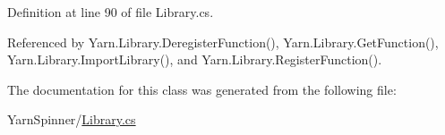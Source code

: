 Definition at line 90 of file Library.\-cs.



Referenced by Yarn.\-Library.\-Deregister\-Function(), Yarn.\-Library.\-Get\-Function(), Yarn.\-Library.\-Import\-Library(), and Yarn.\-Library.\-Register\-Function().



The documentation for this class was generated from the following file\-:\begin{DoxyCompactItemize}
\item 
Yarn\-Spinner/\hyperlink{a00293}{Library.\-cs}\end{DoxyCompactItemize}
